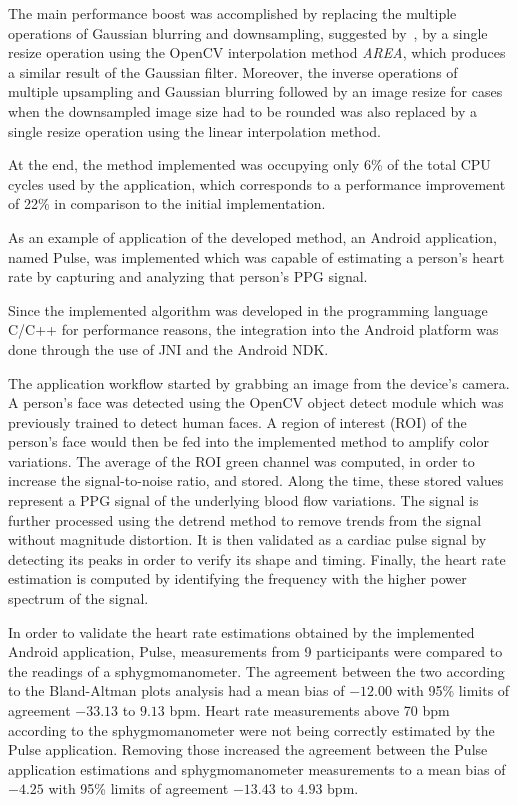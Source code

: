 The main performance boost was accomplished by replacing the multiple
operations of Gaussian blurring and downsampling, suggested
by~\cite{Wu2012Eulerian}, by a single resize operation using the OpenCV
interpolation method \emph{AREA}, which produces a similar result of the
Gaussian filter. Moreover, the inverse operations of multiple
upsampling and Gaussian blurring followed by an image resize
for cases when the downsampled image size had to be rounded was also
replaced by a single resize operation using the linear interpolation method.

At the end, the \evm{} method implemented was occupying only 6\% of the total
CPU cycles used by the application, which corresponds to a performance
improvement of 22\% in comparison to the initial implementation.

As an example of application of the developed \evm{} method, an Android
application, named Pulse, was implemented which was capable of estimating a
person's heart rate by capturing and analyzing that person's PPG signal.

Since the implemented algorithm was developed in the programming language
C/C++ for performance reasons, the integration into the Android platform
was done through the use of JNI and the Android NDK.

The application workflow started by grabbing an image from the device's
camera. A person's face was detected using the OpenCV object detect module
which was previously trained to detect human faces. A region of interest (ROI)
of the person's face would then be fed into the implemented \evm{} method to
amplify color variations. The average of the ROI green channel was computed,
in order to increase the signal-to-noise ratio, and stored. Along the time,
these stored values represent a PPG signal of the underlying blood flow
variations. The signal is further processed using the detrend method
to remove trends from the signal without magnitude distortion. It is then
validated as a cardiac pulse signal by detecting its peaks in order to
verify its shape and timing. Finally, the heart rate estimation is
computed by identifying the frequency with the higher power spectrum of
the signal.

In order to validate the heart rate estimations obtained by the implemented
Android application, Pulse, measurements from 9 participants were compared
to the readings of a sphygmomanometer. The agreement between the two
according to the Bland-Altman plots analysis had a mean bias of $-12.00$ with
95\% limits of agreement $-33.13$ to $9.13$ bpm. Heart rate
measurements above 70 bpm according to the sphygmomanometer were not being
correctly estimated by the Pulse application. Removing those increased the
agreement between the Pulse application estimations and sphygmomanometer
measurements to a mean bias of $-4.25$ with 95\% limits of agreement $-13.43$
to $4.93$ bpm.

